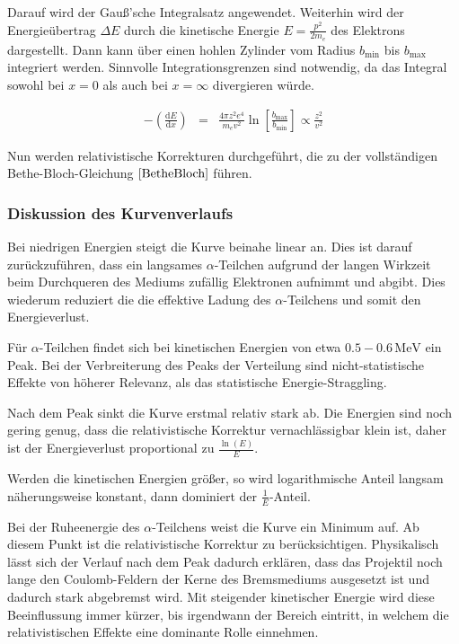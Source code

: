 \documentclass[12pt,a4paper]{scrartcl}
\numberwithin{equation}{section} %
\renewcommand{\[}{} %
\renewcommand{\]}{\noindent} %
\begin{document}
Darauf wird der Gauß'sche Integralsatz angewendet. Weiterhin wird der
Energieübertrag \(\Delta E\) durch die kinetische Energie
\(E=\frac{p^2}{2m_e}\) des Elektrons dargestellt. Dann kann über einen
hohlen Zylinder vom Radius \(b_\mathrm{min}\) bis \(b_\mathrm{max}\)
integriert werden. Sinnvolle Integrationsgrenzen sind notwendig, da das
Integral sowohl bei \(x=0\) als auch bei \(x=\infty\) divergieren würde.

\[
\begin{eqnarray}
    -\left(\frac{\mathrm dE}{\mathrm dx}\right)
        &=& \frac{4\pi z^2 e^4}{m_ev^2}
            \ln\left[\frac{b_\mathrm{max}}{b_\mathrm{min}}\right]
            \propto \frac{z^2}{v^2}
\end{eqnarray}
\]

Nun werden relativistische Korrekturen durchgeführt, die zu der
vollständigen Bethe-Bloch-Gleichung \(\eqref{BetheBloch}\) führen.

\hypertarget{diskussion-des-kurvenverlaufs}{%
\subsubsection{Diskussion des
Kurvenverlaufs}\label{diskussion-des-kurvenverlaufs}}

Bei niedrigen Energien steigt die Kurve beinahe linear an. Dies ist
darauf zurückzuführen, dass ein langsames \(\alpha\)-Teilchen aufgrund
der langen Wirkzeit beim Durchqueren des Mediums zufällig Elektronen
aufnimmt und abgibt. Dies wiederum reduziert die die effektive Ladung
des \(\alpha\)-Teilchens und somit den Energieverlust.

Für \(\alpha\)-Teilchen findet sich bei kinetischen Energien von etwa
\(0.5-0.6\mathrm{\,MeV}\) ein Peak. Bei der Verbreiterung des Peaks der
Verteilung sind nicht-statistische Effekte von höherer Relevanz, als das
statistische Energie-Straggling.

Nach dem Peak sinkt die Kurve erstmal relativ stark ab. Die Energien
sind noch gering genug, dass die relativistische Korrektur
vernachlässigbar klein ist, daher ist der Energieverlust proportional zu
\(\frac{\ln(E)}{E}\).

Werden die kinetischen Energien größer, so wird logarithmische Anteil
langsam näherungsweise konstant, dann dominiert der
\(\frac{1}{E}\)-Anteil.

Bei der Ruheenergie des \(\alpha\)-Teilchens weist die Kurve ein Minimum
auf. Ab diesem Punkt ist die relativistische Korrektur zu
berücksichtigen. Physikalisch lässt sich der Verlauf nach dem Peak
dadurch erklären, dass das Projektil noch lange den Coulomb-Feldern der
Kerne des Bremsmediums ausgesetzt ist und dadurch stark abgebremst wird.
Mit steigender kinetischer Energie wird diese Beeinflussung immer
kürzer, bis irgendwann der Bereich eintritt, in welchem die
relativistischen Effekte eine dominante Rolle einnehmen.
\end{document}
